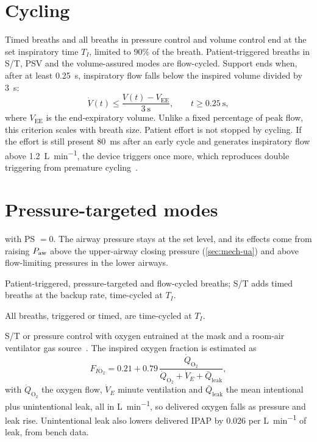 \section{Cycling}
\label{sec:modes-cycle}
Timed breaths and all breaths in pressure control and volume control end at the set inspiratory time $T_I$, limited to 90\% of the breath. Patient-triggered breaths in S/T, PSV and the volume-assured modes are flow-cycled. Support ends when, after at least \SI{0.25}{\second}, inspiratory flow falls below the inspired volume divided by \SI{3}{\second}:
\begin{equation}
\dot V(t) \le \frac{V(t) - V_{\mathrm{EE}}}{\SI{3}{\second}},\qquad t \ge \SI{0.25}{\second},
\label{eq:modes-set}
\end{equation}
where $V_{\mathrm{EE}}$ is the end-expiratory volume. Unlike a fixed percentage of peak flow, this criterion scales with breath size. Patient effort is not stopped by cycling. If the effort is still present \SI{80}{\milli\second} after an early cycle and generates inspiratory flow above \SI{1.2}{\liter\per\minute}, the device triggers once more, which reproduces double triggering from premature cycling~\citep{thille2006}.

\section{Pressure-targeted modes}
\label{sec:modes-pressure}
\begin{description}[leftmargin=*,style=nextline]
\item[CPAP]  with PS $= 0$. The airway pressure stays at the set level, and its effects come from raising $P_{\mathrm{aw}}$ above the upper-airway closing pressure (\cref{sec:mech-ua}) and above flow-limiting pressures in the lower airways.
\item[PSV and S/T] Patient-triggered, pressure-targeted and flow-cycled breaths; S/T adds timed breaths at the backup rate, time-cycled at $T_I$.
\item[Pressure control] All breaths, triggered or timed, are time-cycled at $T_I$.
\item[HOT-HMV] S/T or pressure control with oxygen entrained at the mask and a room-air ventilator gas source~\citep{murphy2017}. The inspired oxygen fraction is estimated as
\begin{equation}
F_{I\mathrm{O_2}} = 0.21 + 0.79\,\frac{\dot Q_{\mathrm{O_2}}}{\dot Q_{\mathrm{O_2}} + \dot V_E + \bar Q_{\mathrm{leak}}},
\label{eq:modes-hot}
\end{equation}
with $\dot Q_{\mathrm{O_2}}$ the oxygen flow, $\dot V_E$ minute ventilation and $\bar Q_{\mathrm{leak}}$ the mean intentional plus unintentional leak, all in \si{\liter\per\minute}, so delivered oxygen falls as pressure and leak rise. Unintentional leak also lowers delivered IPAP by \SI{0.026}{\cmH} per \si{\liter\per\minute} of leak, from bench data.
\end{description}

